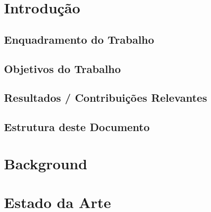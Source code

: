 \documentclass[a4paper]{book}
\begin{document}
\chapter{Introdução}

	\section{Enquadramento do Trabalho}


	\section{Objetivos do Trabalho}


	\section{Resultados / Contribuições Relevantes}


	\section{Estrutura deste Documento}


\chapter{Background}

%

\chapter{Estado da Arte}
\end{document}
